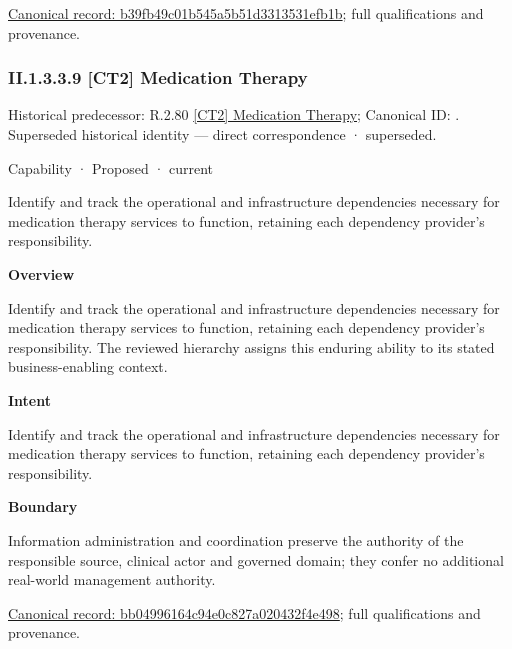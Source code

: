 {\footnotesize \href{../../../../continuum/strategy/capability/b39fb49c01b545a5b51d3313531efb1b.md}{Canonical record: b39fb49c01b545a5b51d3313531efb1b}; full qualifications and provenance.}\par
\subsubsection*{II.1.3.3.9 [CT2] Medication Therapy}
\label{navigation:II.1.3.3.9}

{\small Historical predecessor: R.2.80 \hyperref[element:db064e0cd4794479be1374e97a3d7e63]{[CT2] Medication Therapy}; Canonical ID: \texttt{}. Superseded historical identity — direct correspondence · superseded.}\par
\label{element:bb04996164c94e0c827a020432f4e498}
{\small Capability · Proposed · current}\par

Identify and track the operational and infrastructure dependencies necessary for medication therapy services to function, retaining each dependency provider's responsibility.



\textbf{Overview}



Identify and track the operational and infrastructure dependencies necessary for medication therapy services to function, retaining each dependency provider's responsibility. The reviewed hierarchy assigns this enduring ability to its stated business-enabling context.



\textbf{Intent}



Identify and track the operational and infrastructure dependencies necessary for medication therapy services to function, retaining each dependency provider's responsibility.



\textbf{Boundary}



Information administration and coordination preserve the authority of the responsible source, clinical actor and governed domain; they confer no additional real-world management authority.


{\footnotesize \href{../../../../continuum/strategy/capability/bb04996164c94e0c827a020432f4e498.md}{Canonical record: bb04996164c94e0c827a020432f4e498}; full qualifications and provenance.}\par
